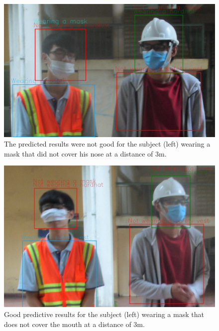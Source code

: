 \documentclass[conference]{IEEEtran}
\begin{document}
\begin{figure}[ht]
	\centerline{\includegraphics[scale=0.17]{images/bad_mask_nose_pred.jpg}}
  	\caption{The predicted results were not good for the subject (left) wearing a mask that did not cover his nose at a distance of 3m.}
  	\label{fig:bad_mask_nose_pred}
\end{figure}
\begin{figure}[ht]
	\centerline{\includegraphics[scale=0.17]{images/bad_mask_mouth_pred.jpg}}
  	\caption{Good predictive results for the subject (left) wearing a mask that does not cover the mouth at a distance of 3m.}
  	\label{fig:bad_mask_mouth_pred}
\end{figure}
\end{document}
